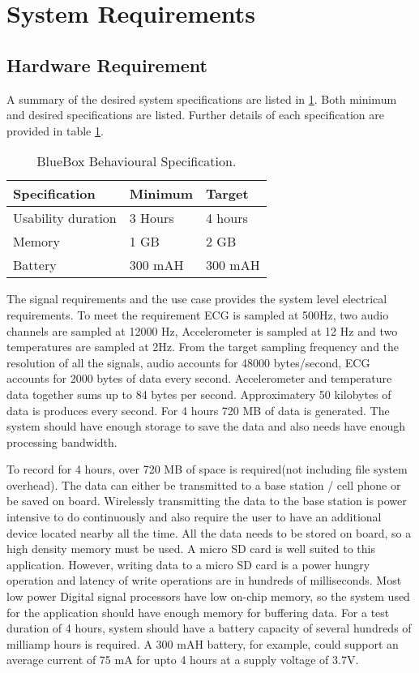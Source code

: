 \section{System Requirements}\label{system requirements}
\subsection{Hardware Requirement}

A summary of the desired system specifications are listed in \ref{table:Behavioural_specs}. Both minimum and desired specifications are listed. Further details of each specification are provided in table \ref{table:Behavioural_specs}.
\begin{table}[h]
	\centering
	\begin{tabular}{|l|l|l|}
		\hline
		Specification & Minimum & Target \\
		\hline
		Usability duration & 3 Hours & 4 hours \\
		Memory & 1 GB & 2 GB \\
		Battery & 300 mAH & 300 mAH \\
		\hline
	\end{tabular}
	\caption{BlueBox Behavioural Specification.}
	\label{table:Behavioural_specs}
\end{table}

\hspace{10mm}The signal requirements and the use case provides the system level electrical requirements. To meet the requirement ECG is sampled at 500Hz, two audio channels are sampled at 12000 Hz, Accelerometer is sampled at 12 Hz and two temperatures are sampled at 2Hz. From the target sampling frequency and the resolution of all the signals, audio accounts for 48000 bytes/second, ECG accounts for 2000 bytes of data every second. Accelerometer and temperature data together sums up to 84 bytes per second. Approximatery 50 kilobytes of data is produces every second. For 4 hours 720 MB of data is generated. The system should have enough storage to save the data and also needs have enough processing bandwidth. 

\hspace{10mm} To record for 4 hours, over 720 MB of space is required(not including file system overhead). The data can either be transmitted to a base station / cell phone or be saved on board. Wirelessly transmitting the data to the base station is power intensive to do continuously and also require the user to have an additional device located nearby all the time. All the data needs to be stored on board, so a high density memory must be used. A micro SD card is well suited to this application. However, writing data to a micro SD card is a power hungry operation and latency of write operations are in hundreds of milliseconds. Most low power Digital signal processors have low on-chip memory, so the system used for the application should have enough memory for buffering data. For a test duration of 4 hours, system should have a battery capacity of several hundreds of milliamp hours is required. A 300 mAH battery, for example, could support an average current of 75 mA for upto 4 hours at a supply voltage of 3.7V. 

